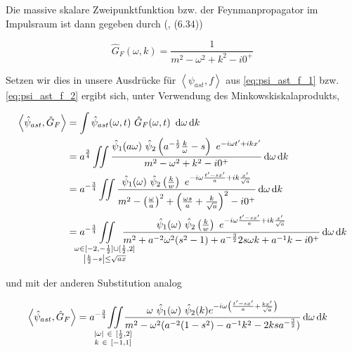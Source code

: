 \documentclass{scrartcl}
\renewcommand*\d{\mathop{}\!\mathrm{d}}
\begin{document}
Die massive skalare Zweipunktfunktion bzw. der Feynmanpropagator im Impulsraum ist dann
gegeben durch (\textcite{Schwartz2014}, (6.34))

\begin{equation}
\label{eq:gf}
    \hat G_F(\omega, k) = \frac{1}{m^2 - \omega^2 + k^2 - i 0^+}
\end{equation}

Setzen wir dies in unsere Ausdrücke für $\left< \psi_{ast}, f\right>$ aus \eqref{eq:psi_ast_f_1}
bzw. \eqref{eq:psi_ast_f_2} ergibt sich, unter Verwendung des Minkowskiskalaprodukts,

\begin{align}
\left< \hat\psi_{ast}, \hat G_F \right> &=
    \int \hat \psi_{ast}(\omega, t) ~\hat G_F(\omega, t) ~\d \omega \d k
    \nonumber \\
    &=
    a^{\frac{3}{4}} \iint \frac{
        \hat \psi_1 (a \omega)
        ~\hat \psi_2 \left(a^{-\frac{1}{2}}\frac{k}{\omega} - s\right)
        ~ e^{-i\omega t' + i k x'}
    }
    {
        m^2 - \omega^2 + k^2 - i 0^+
    }
    \d \omega \d k
    \nonumber \\
    &=
    a^{-\frac{3}{4}} \iint \frac{
        \hat\psi_1(\omega)
        ~\hat \psi_2\left(\tfrac{k}{w}\right)
        ~e^{-i \omega \frac{t' - sx'}{a} + ik \frac{x'}{\sqrt{a}}}
    }
    {
        m^2 - \left(\frac{\omega}{a}\right)^2
        + \left(\frac{\omega s}{a} + \frac{k}{\sqrt{a}}\right)^2 - i0^+
    }
    \d \omega \d k \nonumber \\
    &=
    a^{-\frac{3}{4}}
    \kern -2em \iint
    \limits_{
    \substack{
        \omega \in [-2, -\frac{1}{2}]\cup[\frac{1}{2},2] \\
        \left|\frac{k}{2}-s\right| \leq \sqrt{ax}
        }
    }
    \kern -1.5em
    \frac{
        \hat\psi_1(\omega)
        ~\hat \psi_2\left(\tfrac{k}{w}\right)
        ~e^{-i \omega \frac{t' - sx'}{a} + ik \frac{x'}{\sqrt{a}}}
    }
    {
        m^2 + a^{-2} \omega^2 (s^2 - 1) + a^{-\frac{3}{2}} 2 s \omega k + a^{-1} k  - i0^+
    }
    \d \omega \d k
    \label{eq:psi_ast_gf_1}
\end{align}


und mit der anderen Substitution analog

\begin{align}
    \left< \hat\psi_{ast}, \hat G_F \right>
    &=
    a^{-\frac{3}{4}}
    \kern -1em
    \iint \limits_{\substack{
        |\omega|~ \in~ [\frac{1}{2},2] \\
        k ~\in~ [-1,1]
        }
    }
    \kern -1em
    \frac{
        \omega ~\hat \psi_1(\omega) ~\hat \psi_2(k)
        e^{-i \omega \left(\frac{t' - sx'}{a} + \frac{kx'}{\sqrt{a}}\right)}
    }
    {
        m^2 - \omega^2(a^{-2}(1-s^2)-a^{-1}k^2 - 2 k s a^{-\frac{3}{2}})
    }
    \d \omega \d k
    \label{eq:psi_ast_gf_2}
\end{align}
\end{document}
